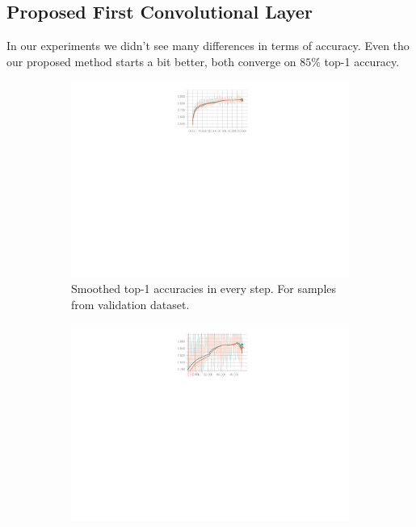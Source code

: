 \subsection{Proposed First Convolutional Layer}
In our experiments we didn't see many differences in terms of accuracy. Even tho our proposed method starts a bit better, both converge on $85\%$ top-1 accuracy. 
\begin{figure}[h]
  \vspace{-45px}
  \centering
  \begin{subfigure}{.79\textwidth}
        \includegraphics[width=1\linewidth]{images/proposed_conv_comparison_evaluation.pdf}
        \caption{Smoothed top-1 accuracies in every step. For samples from validation dataset.}
        \label{fig:conv-comparison-proposed-full}
  \end{subfigure}
  \begin{subfigure}{.79\textwidth}
        \includegraphics[width=1\linewidth]{images/proposed_conv_comparison_evaluation_zoomed.pdf}

\end{subfigure}
\end{figure}
